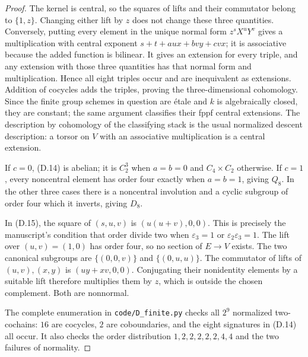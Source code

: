 \begin{proof}
The kernel is central, so the squares of lifts and their
commutator belong to \(\{1,z\}\).  Changing either lift by \(z\)
does not change these three quantities.  Conversely, putting
every element in the unique normal form \(z^sX^uY^v\) gives
a multiplication with central exponent
\(s+t+a ux+b vy+c vx\); it is associative because the added
function is bilinear.  It gives an extension for every triple,
and any extension with those three quantities has that normal
form and multiplication.  Hence all eight triples occur and
are inequivalent as extensions.  Addition of cocycles adds
the triples, proving the three-dimensional cohomology.
Since the finite group schemes in question are étale and \(k\)
is algebraically closed, they are constant; the same argument
classifies their fppf central extensions.  The description by
cohomology of the classifying stack is the usual normalized
descent description: a torsor on \(V\) with an associative
multiplication is a central extension.

If \(c=0\), (D.14) is abelian; it is \(C_2^3\) when
\(a=b=0\) and \(C_4\times C_2\) otherwise.
If \(c=1\), every noncentral element has order four exactly
when \(a=b=1\), giving \(Q_8\).  In the other three cases
there is a noncentral involution and a cyclic subgroup of
order four which it inverts, giving \(D_8\).

In (D.15), the square of \((s,u,v)\) is \((u(u+v),0,0)\).
This is precisely the manuscript's condition that order divide
two when \(\varepsilon _3=1\) or
\(\varepsilon _2\varepsilon _3=1\).
The lift over \((u,v)=(1,0)\) has order four, so no section
of \(E\to V\) exists.  The two canonical subgroups are
\(\{(0,0,v)\}\) and \(\{(0,u,u)\}\).
The commutator of lifts of \((u,v),(x,y)\) is
\((uy+xv,0,0)\).  Conjugating their nonidentity elements by
a suitable lift therefore multiplies them by \(z\), which
is outside the chosen complement.  Both are nonnormal.

The complete enumeration in \texttt{code/D\_finite.py} checks
all \(2^9\) normalized two-cochains: \(16\) are cocycles,
\(2\) are coboundaries, and the eight signatures in (D.14)
all occur.  It also checks the order distribution
\(1,2,2,2,2,2,4,4\) and the two failures of normality.
\end{proof}


